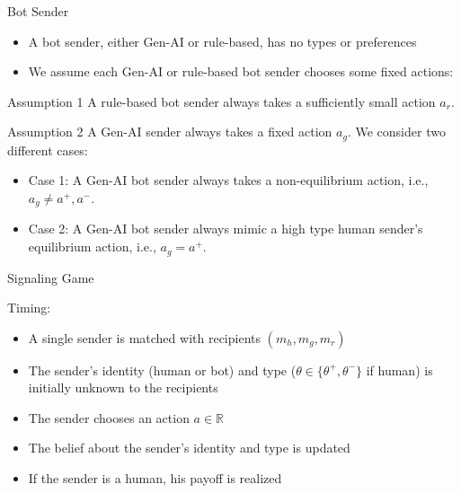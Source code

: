 \documentclass[9pt,aspectratio=1610]{beamer}
\begin{document}
\begin{frame}{Bot Sender}
\begin{itemize}\setlength{\itemsep}{1em}
    \item A bot sender, either Gen-AI or rule-based, has no types or preferences
    \item We assume each Gen-AI or rule-based bot sender chooses some fixed actions:
\end{itemize}
\vspace{1em}

\begin{exampleblock}{Assumption 1}
    A rule-based bot sender always takes a sufficiently small action $a_r$.
\end{exampleblock}

\begin{exampleblock}{Assumption 2}
    A Gen-AI sender always takes a fixed action $a_g$. We consider two different cases:
    \begin{itemize}
        \item Case 1: A Gen-AI bot sender always takes a non-equilibrium action, i.e., $a_g\neq a^+,a^-$.
        \item Case 2: A Gen-AI bot sender always mimic a high type human sender's equilibrium action, i.e., $a_g=a^+$.
    \end{itemize}
\end{exampleblock}
\end{frame}


\begin{frame}{Signaling Game}

Timing:
\begin{itemize}\setlength{\itemsep}{1em}
    \item A single sender is matched with recipients $(m_h,m_g,m_r)$ 
    \item The sender's identity (human or bot) and type ($\theta\in \{\theta^+,\theta^-\}$ if human) is initially unknown to the recipients
    \item The sender chooses an action $a\in \mathbb{R}$
    \item The belief about the sender's identity and type is updated
    \item If the sender is a human, his payoff is realized
\end{itemize}

\end{frame}
\end{document}
